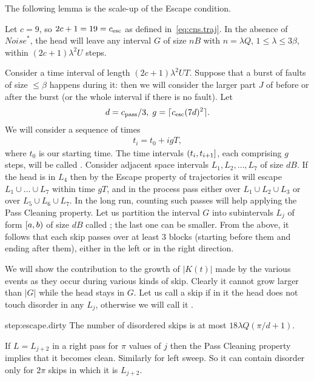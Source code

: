 \documentclass[11pt]{memoir}
\theoremstyle{definition} %
\renewcommand{\le}{\leq}
\def\B{B}
\def\U{U}
\renewcommand{\d}{d}
\newcommand{\g}{g}
\newcommand{\Noise}{\mathit{Noise}}
\newcommand{\passno}{\pi}
\newcommand{\Q}{Q} %
\newcommand{\Tu}{T}
\newcommand{\cns}[1]{c_{\textrm{\upshape #1}}}
\newcommand{\CEsc}{\cns{esc}}
\newcommand{\CPass}{\cns{pass}}
\begin{document}
The following lemma is the scale-up of the Escape condition.

\begin{lemma}[Escape]\label{lem:escape}
  Let \( c  = 9 \), so  \( 2 c + 1 = 19 = \CEsc \) as defined in~\eqref{eq:cns.traj}.
  In the absence of \( \Noise^{*} \), the
  head will leave any interval \( G \) of size \( n\B \) with \( n=\lambda\Q \),
  \( 1\le\lambda\le 3\beta \), within \( (2c+1)\lambda^{2}\U \) steps.
\end{lemma}
\begin{Proof}
  Consider a time interval of length \( (2 c + 1)\lambda^{2}\U\Tu \).
  Suppose that a burst of faults of size \( \le\beta \) happens during it: then we will consider the
  larger part \( J \) of before or after the burst (or the whole interval if there is no fault).
  Let 
\begin{align*}
 \d=\CPass/3 ,\; \g = \cei{\CEsc(7\d)^{2}}.
\end{align*}
We will consider a sequence of times 
\begin{align*}
 t_{i}=t_{0}+i\g\Tu,
\end{align*}
where \( t_{0} \) is our starting time.
The time intervals \( (t_{i},t_{i+1}] \), each comprising \( \g \) steps,  will be called .
Consider adjacent space intervals \( L_{1},L_{2},\dots,L_{7} \) of size \( \d\B \).
If the head is in \( L_{4} \) then by the Escape property of trajectories
it will escape \( L_{1}\cup\dots\cup L_{7} \) within
time \( \g\Tu \), and in the process pass either over \( L_{1}\cup L_{2}\cup L_{3} \)
or over \( L_{5}\cup L_{6}\cup L_{7} \).
In the long run, counting such passes will help applying the Pass Cleaning property.
Let us partition the interval \( G \) into subintervals \( L_{j} \) of form \( \left[a,b\right) \) of size
\( \d\B \) called ; the last one can be smaller.
From the above, it follows that each skip passes over at least 3 blocks
(starting before them and ending after them), either in the left or in the
right direction.

  We will show the contribution to the growth of \( |K(t)| \)
made by the various events as they occur during various kinds of skip.
Clearly it cannot grow larger than \( |G| \) while the head stays in \( G \).
Let us call a skip  if in it the head does not touch disorder in any \( L_{j} \),
otherwise we will call it .

\begin{step+}{step:escape.dirty}
  The number of disordered skips is at most
\(    18\lambda\Q(\passno/d+1) \).
\end{step+}
\begin{pproof}
    If \( L=L_{j+2} \) in a right pass
    for \( \passno \) values of \( j \) then the Pass Cleaning property implies that it becomes clean.
    Similarly for left sweep.
    So it can contain disorder only for \( 2\passno \) skips in which it is \( L_{j+2} \).


\end{pproof}
\end{Proof}
\end{document}

